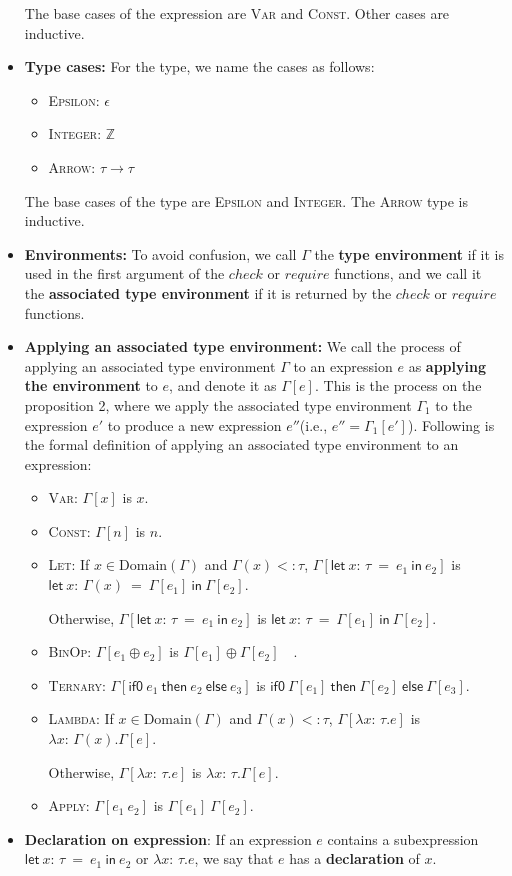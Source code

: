 \documentclass[peerreview, 10pt]{IEEEtran}
\newcommand{\Z}{\ensuremath{\mathbb{Z}}}
\newcommand{\lett}[4]{\ensuremath{\mathsf{let}\ #1\mathsf{:}\,#2\ \mathsf{=}\ #3\ \mathsf{in}\ #4}}
\newcommand{\binop}[2]{\ensuremath{#1\ \mathsf{\oplus}\ #2}}
\newcommand{\ternary}[3]{\ensuremath{\mathsf{if0}\ #1\ \mathsf{then}\ #2\ \mathsf{else}\ #3}}
\newcommand{\funct}[3]{\ensuremath{\lambda #1\mathsf{:}\,#2.#3}}
\newcommand{\apply}[2]{\ensuremath{#1\ #2}}
\newcommand{\arrowt}[2]{\ensuremath{{#1}\rightarrow{#2}}}
\begin{document}
\begin{itemize}
    The base cases of the expression are \textsc{Var} and \textsc{Const}. Other cases are inductive.
    \item \textbf{Type cases:} For the type, we name the cases as follows:
    \begin{itemize}
        \item \textsc{Epsilon}: $\epsilon$
        \item \textsc{Integer}: $\Z$
        \item \textsc{Arrow}: $\arrowt{\tau}{\tau}$
    \end{itemize}

    The base cases of the type are \textsc{Epsilon} and \textsc{Integer}. The \textsc{Arrow} type is inductive.
    \item \textbf{Environments:} To avoid confusion, we call $\Gamma$ the \textbf{type environment} if it is used in the first argument of the $check$ or $require$ functions, and we call it the \textbf{associated type environment} if it is returned by the $check$ or $require$ functions.
    \item \textbf{Applying an associated type environment:} We call the process of applying an associated type environment $\Gamma$ to an expression $e$ as \textbf{applying the environment} to $e$, and denote it as $\Gamma[e]$. This is the process on the proposition 2, where we apply the associated type environment $\Gamma_1$ to the expression $e'$ to produce a new expression $e''$(i.e., $e'' = \Gamma_1[e']$). Following is the formal definition of applying an associated type environment to an expression:
    \begin{itemize}
        \item \textsc{Var}: $\Gamma[x]$ is $x$.
        \item \textsc{Const}: $\Gamma[n]$ is $n$.
        \item \textsc{Let}: If $x\in \text{Domain}(\Gamma)$ and $\Gamma(x)<:\tau$, $\Gamma[\lett{x}{\tau}{e_1}{e_2}]$ is $\lett{x}{\Gamma(x)}{\Gamma[e_1]}{\Gamma[e_2]}$.

        Otherwise, $\Gamma[\lett{x}{\tau}{e_1}{e_2}]$ is $\lett{x}{\tau}{\Gamma[e_1]}{\Gamma[e_2]}$.
        \item \textsc{BinOp}: $\Gamma[\binop{e_1}{e_2}]$ is $\binop{\Gamma[e_1]}{\Gamma[e_2]}\quad$.
        \item \textsc{Ternary}: $\Gamma[\ternary{e_1}{e_2}{e_3}]$ is $\ternary{\Gamma[e_1]}{\Gamma[e_2]}{\Gamma[e_3]}$.
        \item \textsc{Lambda}: If $x\in \text{Domain}(\Gamma)$ and $\Gamma(x)<:\tau$, $\Gamma[\funct{x}{\tau}{e}]$ is $\funct{x}{\Gamma(x)}{\Gamma[e]}$.

        Otherwise, $\Gamma[\funct{x}{\tau}{e}]$ is $\funct{x}{\tau}{\Gamma[e]}$.
        \item \textsc{Apply}: $\Gamma[\apply{e_1}{e_2}]$ is $\apply{\Gamma[e_1]}{\Gamma[e_2]}$.
    \end{itemize}
    \item \textbf{Declaration on expression}: If an expression $e$ contains a subexpression \lett{x}{\tau}{e_1}{e_2} or $\funct{x}{\tau}{e}$, we say that $e$ has a \textbf{declaration} of $x$.
\end{itemize}
\end{document}
